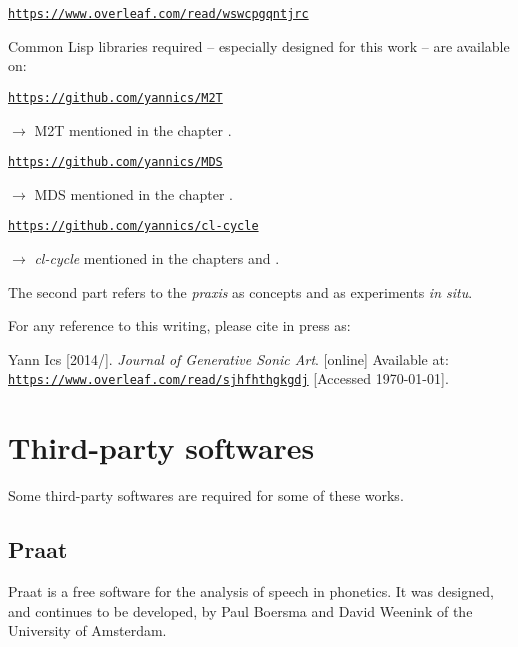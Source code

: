 \href{https://www.overleaf.com/read/wswcpgqntjrc}{\texttt{\small https://www.overleaf.com/read/wswcpgqntjrc}}

\bigskip
Common Lisp libraries required -- especially designed for this work -- are available on:

\smallskip

\href{https://github.com/yannics/M2T}{\texttt{\small https://github.com/yannics/M2T}}

\noindent $\rightarrow$ M2T mentioned in the chapter \textsl{}.

\smallskip

\href{https://github.com/yannics/MDS}{\texttt{\small https://github.com/yannics/MDS}}

\noindent $\rightarrow$ MDS mentioned in the chapter  \textsl{}.

\smallskip

\href{https://github.com/yannics/cl-cycle}{\texttt{\small https://github.com/yannics/cl-cycle}}

\noindent $\rightarrow$ \textsl{cl-cycle} mentioned in the chapters \textsl{} and  \textsl{}.

\newpage
The second part refers to the \textit{praxis} as concepts and as experiments \textit{in situ}. 

\bigskip

For any reference to this writing, please cite in press as: 

\noindent Yann Ics [2014/\the\year]. \textit{Journal of Generative Sonic Art}. [online] Available at: \href{https://www.overleaf.com/read/sjhfhthgkgdj}{\texttt{\small https://www.overleaf.com/read/sjhfhthgkgdj}} [Accessed \today].

\section*{Third-party softwares}
\label{tps}

Some third-party softwares are required for some of these works. 

\subsection*{Praat}

Praat is a free software for the analysis of speech in phonetics. It was designed, and continues to be developed, by Paul Boersma and David Weenink of the University of Amsterdam. 

